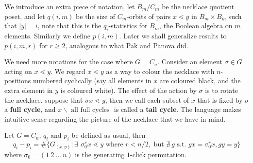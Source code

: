 \documentclass[12pt]{article}
\newcommand{\1}{\mathbb{I}}
\newcommand{\minus}{\backslash}
\theoremstyle{definition}
\theoremstyle{definition}
\theoremstyle{definition}
\theoremstyle{definition}
\theoremstyle{definition}
\theoremstyle{definition}
\begin{document}
We introduce an extra piece of notation, let $B_m/C_m$ be the necklace quotient poset, and let $q (i, m)$  be the size of $C_m$-orbits of pairs $x \lessdot y$ in $B_m \times B_m$ such that $|y|=i$, note that this is the $q_i$-statistics for $B_m$, the Boolean algebra on $m$ elements.  Similarly we define $p (i, m)$.  Later we shall generalize results to $p(i, m ,r)$ for $r \ge 2$, analogous to what Pak and Panova did. 


We need more notations for the case where $G = C_n$. Consider an element $\sigma \in G$ acting on $x \lessdot y$. We regard $x \lessdot y$ as a way to colour the necklace with $n$-positions numbered cyclically (say all elements in $x$ are coloured black, and the extra element in $y$ is coloured white). The effect of the action by $\sigma$ is to rotate the necklace. suppose that $\sigma x \lessdot y$, then we call each subset of $x$ that is fixed by $\sigma$ a \textbf{full cycle}, and $x \minus \text{ all full cycles }$ is called a \textbf{tail cycle}.  The language makes intuitive sense regarding the picture of the necklace that we have in mind. 

\lemma Let $G= C_n$, $q_i$ and $p_i$ be defined as usual,  then $$q_i - p_i = \#\{G_{(x,y)} : \exists \: \, \sigma_0^r x \lessdot y \text{ where } r < n/2, \text{ but } \nexists \:  g \text{ s.t. } g x = \sigma_0 ^r x, g y = y \}$$ where $\sigma_0 = (1 \: 2 \: ... \: n)$ is the generating $1$-click permutation.
\end{document}
